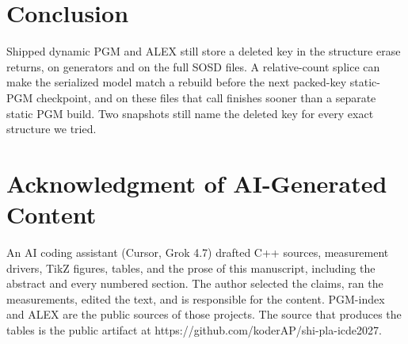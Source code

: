 \documentclass[conference]{IEEEtran}
\begin{document}
\section{Conclusion}

Shipped dynamic PGM and ALEX still store a deleted key in the structure erase returns, on generators and on the full SOSD files.
A relative-count splice can make the serialized model match a rebuild before the next packed-key static-PGM checkpoint, and on these files that call finishes sooner than a separate static PGM build.
Two snapshots still name the deleted key for every exact structure we tried.




\section*{Acknowledgment of AI-Generated Content}
An AI coding assistant (Cursor, Grok 4.7) drafted C++ sources, measurement drivers, TikZ figures, tables, and the prose of this manuscript, including the abstract and every numbered section.
The author selected the claims, ran the measurements, edited the text, and is responsible for the content.
PGM-index and ALEX are the public sources of those projects.
The source that produces the tables is the public artifact at https://github.com/koderAP/shi-pla-icde2027.
\end{document}
